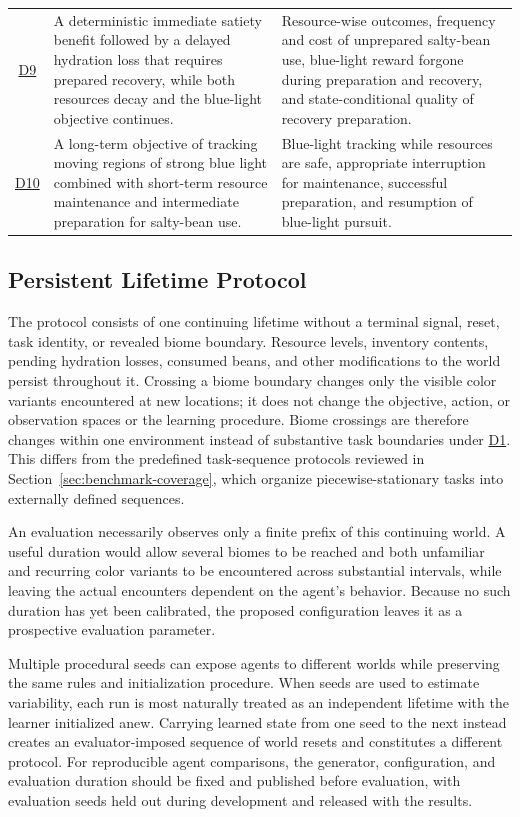 \documentclass[10pt,journal,compsoc]{IEEEtran}
\DeclareRobustCommand{\Dref}[1]{\hyperref[sec:d#1]{D#1}}
\begin{document}
\begin{table}[!t]
\begin{tabularx}{\textwidth}{
        @{}
        c
        >{\raggedright\arraybackslash}p{}
        >{\raggedright\arraybackslash}X
        @{}
    }
        \Dref{9} & A deterministic immediate satiety benefit followed by a delayed hydration loss that requires prepared recovery, while both resources decay and the blue-light objective continues. & Resource-wise outcomes, frequency and cost of unprepared salty-bean use, blue-light reward forgone during preparation and recovery, and state-conditional quality of recovery preparation. \\
        \Dref{10} & A long-term objective of tracking moving regions of strong blue light combined with short-term resource maintenance and intermediate preparation for salty-bean use. & Blue-light tracking while resources are safe, appropriate interruption for maintenance, successful preparation, and resumption of blue-light pursuit. \\
        \bottomrule
    \end{tabularx}
\end{table}

\subsection{Persistent Lifetime Protocol}

The protocol consists of one continuing lifetime without a terminal signal, reset, task identity, or revealed biome boundary.
Resource levels, inventory contents, pending hydration losses, consumed beans, and other modifications to the world persist throughout it.
Crossing a biome boundary changes only the visible color variants encountered at new locations; it does not change the objective, action, or observation spaces or the learning procedure.
Biome crossings are therefore changes within one environment instead of substantive task boundaries under \Dref{1}.
This differs from the predefined task-sequence protocols reviewed in Section~\ref{sec:benchmark-coverage}, which organize piecewise-stationary tasks into externally defined sequences.

An evaluation necessarily observes only a finite prefix of this continuing world.
A useful duration would allow several biomes to be reached and both unfamiliar and recurring color variants to be encountered across substantial intervals, while leaving the actual encounters dependent on the agent's behavior.
Because no such duration has yet been calibrated, the proposed configuration leaves it as a prospective evaluation parameter.

Multiple procedural seeds can expose agents to different worlds while preserving the same rules and initialization procedure.
When seeds are used to estimate variability, each run is most naturally treated as an independent lifetime with the learner initialized anew.
Carrying learned state from one seed to the next instead creates an evaluator-imposed sequence of world resets and constitutes a different protocol.
For reproducible agent comparisons, the generator, configuration, and evaluation duration should be fixed and published before evaluation, with evaluation seeds held out during development and released with the results.
\end{document}
